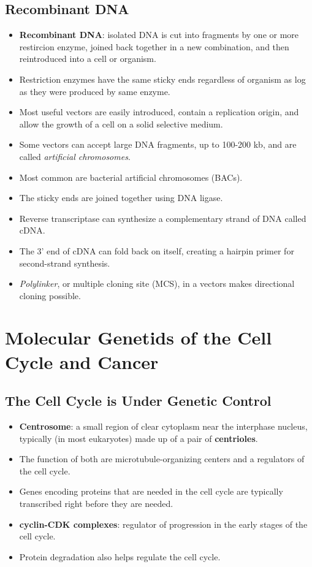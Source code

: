 \documentclass[12pt,a4paper]{article}
\begin{document}
\subsection{Recombinant DNA}
\begin{itemize}
    \item \textbf{Recombinant DNA}: isolated DNA is cut into fragments by one or more restircion enzyme, joined back together in a new combination, and then reintroduced into a cell or organism.
    \item Restriction enzymes have the same sticky ends regardless of organism as log as they were produced by same enzyme.
    \item Most useful vectors are easily introduced, contain a replication origin, and allow the growth of a cell on a solid selective medium.
    \item Some vectors can accept large DNA fragments, up to 100-200 kb, and are called \textit{artificial chromosomes}. 
    \item Most common are bacterial artificial chromosomes (BACs).
    \item The sticky ends are joined together using DNA ligase.
    \item Reverse transcriptase can synthesize a complementary strand of DNA called cDNA.
    \item The 3' end of cDNA can fold back on itself, creating a hairpin primer for second-strand synthesis.
    \item \textit{Polylinker}, or multiple cloning site (MCS), in a vectors makes directional cloning possible. 
\end{itemize}
\setcounter{section}{12}
\clearpage
\section{Molecular Genetids of the Cell Cycle and Cancer}
\subsection{The Cell Cycle is Under Genetic Control}
\begin{itemize}
    \item \textbf{Centrosome}: a small region of clear cytoplasm near the interphase nucleus, typically (in most eukaryotes) made up of a pair of \textbf{centrioles}. 
    \item The function of both are microtubule-organizing centers and a regulators of the cell cycle.
    \item Genes encoding proteins that are needed in the cell cycle are typically transcribed right before they are needed.
    \item \textbf{cyclin-CDK complexes}: regulator of progression in the early stages of the cell cycle.
    \item Protein degradation also helps regulate the cell cycle.
\end{itemize}
\end{document}
